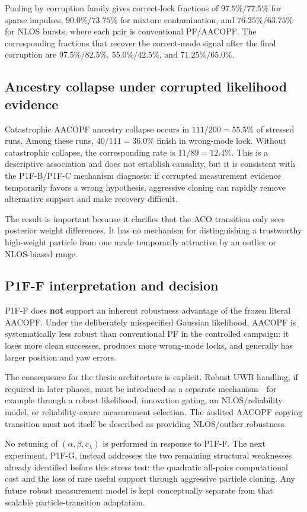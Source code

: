 Pooling by corruption family gives correct-lock fractions of $97.5\%/77.5\%$ for sparse impulses, $90.0\%/73.75\%$ for mixture contamination, and $76.25\%/63.75\%$ for NLOS bursts, where each pair is conventional PF/AACOPF. The corresponding fractions that recover the correct-mode signal after the final corruption are $97.5\%/82.5\%$, $55.0\%/42.5\%$, and $71.25\%/65.0\%$.

\subsection{Ancestry collapse under corrupted likelihood evidence}
Catastrophic AACOPF ancestry collapse occurs in $111/200=55.5\%$ of stressed runs. Among these runs, $40/111=36.0\%$ finish in wrong-mode lock. Without catastrophic collapse, the corresponding rate is $11/89=12.4\%$. This is a descriptive association and does not establish causality, but it is consistent with the P1F-B/P1F-C mechanism diagnosis: if corrupted measurement evidence temporarily favors a wrong hypothesis, aggressive cloning can rapidly remove alternative support and make recovery difficult.

The result is important because it clarifies that the ACO transition only sees posterior weight differences. It has no mechanism for distinguishing a trustworthy high-weight particle from one made temporarily attractive by an outlier or NLOS-biased range.

\subsection{P1F-F interpretation and decision}
P1F-F does \textbf{not} support an inherent robustness advantage of the frozen literal AACOPF. Under the deliberately misspecified Gaussian likelihood, AACOPF is systematically less robust than conventional PF in the controlled campaign: it loses more clean successes, produces more wrong-mode locks, and generally has larger position and yaw errors.

The consequence for the thesis architecture is explicit. Robust UWB handling, if required in later phases, must be introduced as a separate mechanism---for example through a robust likelihood, innovation gating, an NLOS/reliability model, or reliability-aware measurement selection. The audited AACOPF copying transition must not itself be described as providing NLOS/outlier robustness.

No retuning of $(\alpha,\beta,c_\lambda)$ is performed in response to P1F-F. The next experiment, P1F-G, instead addresses the two remaining structural weaknesses already identified before this stress test: the quadratic all-pairs computational cost and the loss of rare useful support through aggressive particle cloning. Any future robust measurement model is kept conceptually separate from that scalable particle-transition adaptation.

